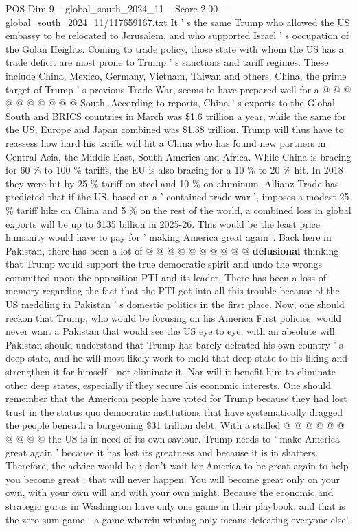 \begin{textsample}{POS Dim 9 – global\_south\_2024\_11 – Score 2.00 – global\_south\_2024\_11/117659167.txt}
It ' s the same Trump who allowed the US embassy to be relocated to Jerusalem, and who supported Israel ' s occupation of the Golan Heights.
Coming to trade policy, those state with whom the US has a trade deficit are most prone to Trump ' s sanctions and tariff regimes.
These include China, Mexico, Germany, Vietnam, Taiwan and others.
China, the prime target of Trump ' s previous Trade War, seems to have prepared well for a @ @ @ @ @ @ @ @ @ @ South.
According to reports, China ' s exports to the Global South and BRICS countries in March was \$1.6 trillion a year, while the same for the US, Europe and Japan combined was \$1.38 trillion.
Trump will thus have to reassess how hard his tariffs will hit a China who has found new partners in Central Asia, the Middle East, South America and Africa.
While China is bracing for 60 \% to 100 \% tariffs, the EU is also bracing for a 10 \% to 20 \% hit.
In 2018 they were hit by 25 \% tariff on steel and 10 \% on aluminum.
Allianz Trade has predicted that if the US, based on a ' contained trade war ', imposes a modest 25 \% tariff hike on China and 5 \% on the rest of the world, a combined loss in global exports will be up to \$135 billion in 2025-26.
This would be the least price humanity would have to pay for ' making America great again '.
Back here in Pakistan, there has been a lot of @ @ @ @ @ @ @ @ @ @ \textbf{delusional} thinking that Trump would support the true democratic spirit and undo the wrongs committed upon the opposition PTI and its leader.
There has been a loss of memory regarding the fact that the PTI got into all this trouble because of the US meddling in Pakistan ' s domestic politics in the first place.
Now, one should reckon that Trump, who would be focusing on his America First policies, would never want a Pakistan that would see the US eye to eye, with an absolute will.
Pakistan should understand that Trump has barely defeated his own country ' s deep state, and he will most likely work to mold that deep state to his liking and strengthen it for himself - not eliminate it.
Nor will it benefit him to eliminate other deep states, especially if they secure his economic interests.
One should remember that the American people have voted for Trump because they had lost trust in the status quo democratic institutions that have systematically dragged the people beneath a burgeoning \$31 trillion debt.
With a stalled @ @ @ @ @ @ @ @ @ @ the US is in need of its own saviour.
Trump needs to ' make America great again ' because it has lost its greatness and because it is in shatters.
Therefore, the advice would be : don't wait for America to be great again to help you become great ; that will never happen.
You will become great only on your own, with your own will and with your own might.
Because the economic and strategic gurus in Washington have only one game in their playbook, and that is the zero-sum game - a game wherein winning only means defeating everyone else!

\end{textsample}
